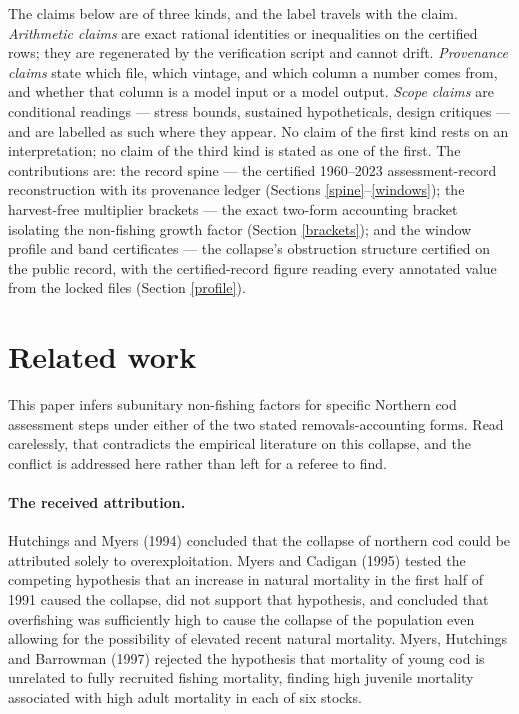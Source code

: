 \documentclass[10pt,twocolumn]{article}
\theoremstyle{plain}
\theoremstyle{remark}
\begin{document}
The claims below are of three kinds, and the label travels with the
claim. \emph{Arithmetic claims} are exact rational identities or
inequalities on the certified rows; they are regenerated by the
verification script and cannot drift. \emph{Provenance claims} state
which file, which vintage, and which column a number comes from, and
whether that column is a model input or a model output. \emph{Scope
claims} are conditional readings --- stress bounds, sustained
hypotheticals, design critiques --- and are labelled as such where
they appear. No claim of the first kind rests on an interpretation; no
claim of the third kind is stated as one of the first. The
contributions are: the record spine --- the certified 1960--2023
assessment-record reconstruction with its provenance ledger (Sections
\ref{spine}--\ref{windows}); the harvest-free multiplier brackets ---
the exact two-form accounting bracket isolating the non-fishing growth
factor (Section \ref{brackets}); and the window profile and band
certificates --- the collapse's obstruction structure certified on the
public record, with the certified-record figure reading every annotated
value from the locked files (Section \ref{profile}).

\section{Related work}
\label{priorart}

This paper infers subunitary non-fishing factors for specific Northern cod
assessment steps under either of the two stated removals-accounting forms. Read carelessly, that contradicts the empirical
literature on this collapse, and the conflict is addressed here rather than left for a
referee to find.

\paragraph{The received attribution.} Hutchings and Myers (1994) concluded that the collapse
of northern cod could be attributed solely to overexploitation. Myers and Cadigan (1995)
tested the competing hypothesis that an increase in natural mortality in the first half of
1991 caused the collapse, did not support that hypothesis, and concluded that overfishing was
sufficiently high to cause the collapse of the population even allowing for the possibility
of elevated recent natural mortality. Myers, Hutchings and Barrowman (1997) rejected the
hypothesis that mortality of young cod is unrelated to fully recruited fishing mortality,
finding high juvenile mortality associated with high adult mortality in each of six stocks.
\end{document}
